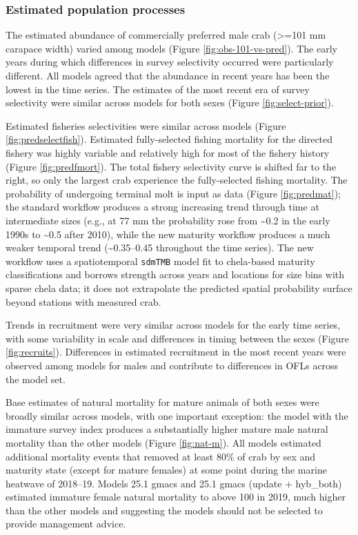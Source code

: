 \documentclass[
]{article}
\begin{document}
\subsubsection{Estimated population processes}\label{estimated-population-processes}

The estimated abundance of commercially preferred male crab (\textgreater=101 mm carapace width) varied among models (Figure \ref{fig:obs-101-vs-pred}). The early years during which differences in survey selectivity occurred were particularly different. All models agreed that the abundance in recent years has been the lowest in the time series. The estimates of the most recent era of survey selectivity were similar across models for both sexes (Figure \ref{fig:select-prior}).

Estimated fisheries selectivities were similar across models (Figure \ref{fig:predselectfish}). Estimated fully-selected fishing mortality for the directed fishery was highly variable and relatively high for most of the fishery history (Figure \ref{fig:predfmort}). The total fishery selectivity curve is shifted far to the right, so only the largest crab experience the fully-selected fishing mortality. The probability of undergoing terminal molt is input as data (Figure \ref{fig:predmat}); the standard workflow produces a strong increasing trend through time at intermediate sizes (e.g., at 77 mm the probability rose from \textasciitilde0.2 in the early 1990s to \textasciitilde0.5 after 2010), while the new maturity workflow produces a much weaker temporal trend (\textasciitilde0.35--0.45 throughout the time series). The new workflow uses a spatiotemporal \texttt{sdmTMB} model fit to chela-based maturity classifications and borrows strength across years and locations for size bins with sparse chela data; it does not extrapolate the predicted spatial probability surface beyond stations with measured crab.

Trends in recruitment were very similar across models for the early time series, with some variability in scale and differences in timing between the sexes (Figure \ref{fig:recruits}). Differences in estimated recruitment in the most recent years were observed among models for males and contribute to differences in OFLs across the model set.

Base estimates of natural mortality for mature animals of both sexes were broadly similar across models, with one important exception: the model with the immature survey index produces a substantially higher mature male natural mortality than the other models (Figure \ref{fig:nat-m}). All models estimated additional mortality events that removed at least 80\% of crab by sex and maturity state (except for mature females) at some point during the marine heatwave of 2018--19. Models 25.1 gmacs and 25.1 gmacs (update + hyb\_both) estimated immature female natural mortality to above 100 in 2019, much higher than the other models and suggesting the models should not be selected to provide management advice.
\end{document}
